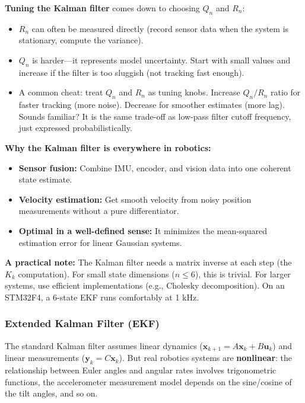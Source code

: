 \textbf{Tuning the Kalman filter} comes down to choosing $Q_n$ and $R_n$:
\begin{itemize}
    \item $R_n$ can often be measured directly (record sensor data when the system is stationary, compute the variance).
    \item $Q_n$ is harder---it represents model uncertainty. Start with small values and increase if the filter is too sluggish (not tracking fast enough).
    \item A common cheat: treat $Q_n$ and $R_n$ as tuning knobs. Increase $Q_n / R_n$ ratio for faster tracking (more noise). Decrease for smoother estimates (more lag). Sounds familiar? It is the same trade-off as low-pass filter cutoff frequency, just expressed probabilistically.
\end{itemize}

\textbf{Why the Kalman filter is everywhere in robotics:}
\begin{itemize}
    \item \textbf{Sensor fusion:} Combine IMU, encoder, and vision data into one coherent state estimate.
    \item \textbf{Velocity estimation:} Get smooth velocity from noisy position measurements without a pure differentiator.
    \item \textbf{Optimal in a well-defined sense:} It minimizes the mean-squared estimation error for linear Gaussian systems.
\end{itemize}

\textbf{A practical note:} The Kalman filter needs a matrix inverse at each step (the $K_k$ computation). For small state dimensions ($n \leq 6$), this is trivial. For larger systems, use efficient implementations (e.g., Cholesky decomposition). On an STM32F4, a 6-state EKF runs comfortably at 1 kHz.

\subsubsection{Extended Kalman Filter (EKF)}

The standard Kalman filter assumes linear dynamics ($\mathbf{x}_{k+1} = A\mathbf{x}_k + B\mathbf{u}_k$) and linear measurements ($\mathbf{y}_k = C\mathbf{x}_k$). But real robotics systems are \textbf{nonlinear}: the relationship between Euler angles and angular rates involves trigonometric functions, the accelerometer measurement model depends on the sine/cosine of the tilt angles, and so on.


